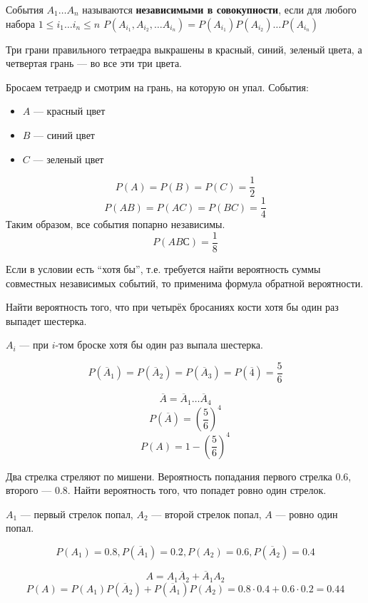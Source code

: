 \documentclass[12pt, a4paper, oneside]{book}
\begin{document}
\begin{definition}
    События \(A_1 \dots A_n\) называются \textbf{независимыми в совокупности}, если для любого набора \(1 \leq i_1 \dots i_n \leq n\) \(P(A_{i_1}, A_{i_2}, \dots A_{i_n}) = P(A_{i_1})P(A_{i_2}) \dots P(A_{i_n})\)
\end{definition}

\begin{example}[Бернштейн]
    Три грани правильного тетраедра выкрашены в красный, синий, зеленый цвета, а четвертая грань --- во все эти три цвета.

    Бросаем тетраедр и смотрим на грань, на которую он упал. События:
    \begin{itemize}
        \item \(A\) --- красный цвет
        \item \(B\) --- синий цвет
        \item \(C\) --- зеленый цвет
    \end{itemize}

    \[P(A) = P(B) = P(C) = \frac{1}{2}\]
    \[P(AB) = P(AC) = P(BC) = \frac{1}{4}\]
    Таким образом, все события попарно независимы.
    \[P(ABС) = \frac{1}{8}\]
\end{example}

\begin{remark}
    Если в условии есть ``хотя бы'', т.е. требуется найти вероятность суммы совместных независимых событий, то применима формула обратной вероятности.
\end{remark}

\begin{example}
    Найти вероятность того, что при четырёх бросаниях кости хотя бы один раз выпадет шестерка.

    \(A_i\) --- при \(i\)-том броске хотя бы один раз выпала шестерка.

    \[P(\overline A_1) = P(\overline A_2) = P(\overline A_3) = P(\overline 4) = \frac{5}{6}\]

    \[\overline A = \overline A_1 \dots \overline A_4\]
    \[P(\overline A) = \left( \frac{5}{6} \right)^4\]
    \[P(A) = 1 - \left( \frac{5}{6} \right)^4\]
\end{example}

\begin{example}
    Два стрелка стреляют по мишени. Вероятность попадания первого стрелка \(0.6\), второго --- \(0.8\). Найти вероятность того, что попадет ровно один стрелок.

    \(A_1\) --- первый стрелок попал, \(A_2\) --- второй стрелок попал, \(A\) --- ровно один попал.

    \[P(A_1) = 0.8, P(\overline A_1) = 0.2, P(A_2) = 0.6, P(\overline A_2) = 0.4\]

    \[A = A_1 \overline A_2 + \overline A_1 A_2\]
    \[P(A) = P(A_1) P(\overline A_2) + P(\overline A_1) P(A_2) = 0.8 \cdot 0.4 + 0.6 \cdot 0.2 = 0.44\]
\end{example}
\end{document}
